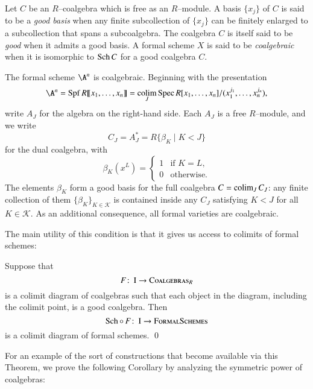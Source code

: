 \begin{definition}\label{DefnCoalgebraicFormalScheme}
Let $C$ be an $R$--coalgebra which is free as an $R$--module.  A basis $\{x_j\}$ of $C$ is said to be a \textit{good basis} when any finite subcollection of $\{x_j\}$ can be finitely enlarged to a subcollection that spans a subcoalgebra.  The coalgebra $C$ is itself said to be \textit{good} when it admits a good basis.  A formal scheme $X$ is said to be \textit{coalgebraic} when it is isomorphic to $\operatorname{Sch} C$ for a good coalgebra $C$.
\end{definition}

\begin{example}\label{FVarsAreCoalgebraic}
The formal scheme $\A^n$ is coalgebraic.  Beginning with the presentation \[\A^n = \Spf R\ps{x_1, \ldots, x_n} = \colim_J \Spec R[x_1, \ldots, x_n] / (x_1^{j_1}, \ldots, x_n^{j_n}),\] write $A_J$ for the algebra on the right-hand side.  Each $A_J$ is a free $R$--module, and we write \[C_J = A_J^* = R\{\beta_K \mid K < J\}\] for the dual coalgebra, with \[\beta_K(x^L) = \begin{cases} 1 & \text{if $K = L$}, \\ 0 & \text{otherwise}. \end{cases}\]  The elements $\beta_K$ form a good basis for the full coalgebra $C = \operatorname*{colim}_J C_J$: any finite collection of them $\{\beta_K\}_{K \in \mathcal K}$ is contained inside any $C_J$ satisfying $K < J$ for all $K \in \mathcal K$.  As an additional consequence, all formal varieties are coalgebraic.
\end{example}

The main utility of this condition is that it gives us access to colimits of formal schemes:

\begin{theorem}\label{CoalgebraicColimitsExist}
Suppose that \[F\colon\thinspace \normalfont\textsc{I} \to \normalfont\textsc{Coalgebras}_R\] is a colimit diagram of coalgebras such that each object in the diagram, including the colimit point, is a good coalgebra.  Then \[\operatorname{Sch} \circ \, F\colon\thinspace \normalfont\textsc{I} \to \normalfont\textsc{FormalSchemes}\] is a colimit diagram of formal schemes. \qed
\end{theorem}

\noindent For an example of the sort of constructions that become available via this Theorem, we prove the following Corollary by analyzing the symmetric power of coalgebras:

